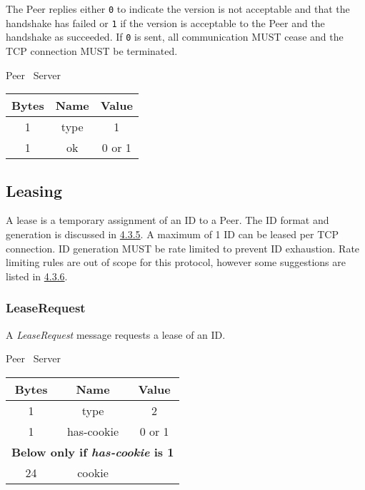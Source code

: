 The Peer replies either \texttt{0} to indicate the version is not acceptable and that the handshake has
failed or \texttt{1} if the version is acceptable to the Peer and the handshake as succeeded. If \texttt{0} is sent, all
communication MUST cease and the TCP connection MUST be terminated.

\begin{center}
    Peer \textrightarrow\ Server\\
    \begin{tabular}{|c|c|c|}
        \hline
        \textbf{Bytes} & \textbf{Name} & \textbf{Value} \\
        \hline
        1              & type          & 1              \\
        \hline
        1              & ok            & 0 or 1         \\
        \hline
    \end{tabular}
\end{center}

\subsection{Leasing}

A lease is a temporary assignment of an ID to a Peer. The ID format and generation is discussed in
\hyperlink{subsubsection.4.3.5}{4.3.5}. A maximum of 1 ID can be leased per TCP connection. ID generation MUST be
rate limited to prevent ID exhaustion. Rate limiting rules are out of scope for this protocol, however some
suggestions are listed in \hyperlink{subsubsection.4.3.6}{4.3.6}.

\subsubsection{LeaseRequest}

A \emph{LeaseRequest} message requests a lease of an ID.

\begin{center}
    Peer \textrightarrow\ Server\\
    \begin{tabular}{|c|c|c|}
        \hline
        \textbf{Bytes} & \textbf{Name} & \textbf{Value} \\
        \hline
        1              & type          & 2              \\
        \hline
        1              & has-cookie    & 0 or 1         \\
        \hline
        \multicolumn{3}{|c|}{\textbf{Below only if \emph{has-cookie} is 1} } \\
        \hline
        24             & cookie        &                \\
        \hline
    \end{tabular}
\end{center}

